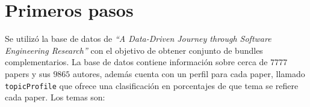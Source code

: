 \section{Primeros pasos}
{\begin{small}%
\begin{flushright}%
\it
\end{flushright}%
\end{small}%
\vspace{.5cm}}
Se utilizó la base de datos de \textit{\textquotedblleft A Data-Driven Journey through Software 
Engineering Research\textquotedblright} con el objetivo de obtener conjunto de bundles 
complementarios. La base de datos contiene información sobre cerca de $7777$ papers y sus $9865$ 
autores, además cuenta con un perfil para cada paper, llamado \texttt{topicProfile} que ofrece una 
clasificación en porcentajes de que tema se refiere cada paper. Los temas son:

